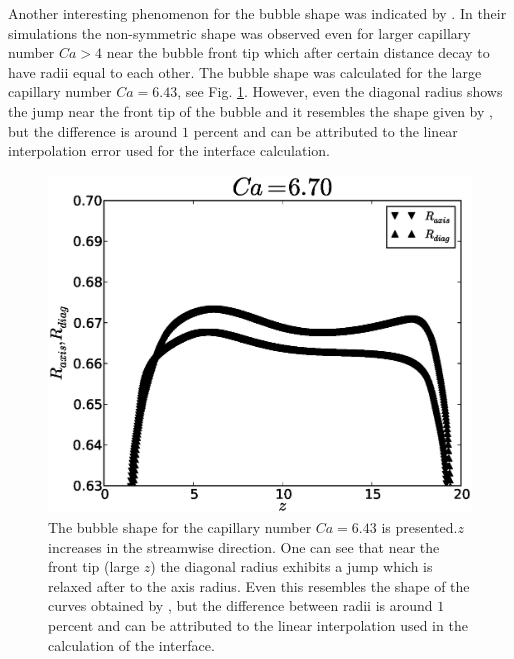 \documentclass{article}
\begin{document}
Another interesting phenomenon for the bubble shape was indicated by \citet{heil-threedim}. In
their simulations the non-symmetric shape was observed even for larger capillary number $Ca>4$ near
the bubble front tip which after certain distance decay to have radii equal to each other. The
bubble shape was calculated for the large capillary number $Ca=6.43$, see Fig.
\ref{fig:bubble:ca:large}. However, even the diagonal radius shows the jump near the front tip of
the bubble and it resembles the shape given by \citet{heil-threedim}, but the difference is around
$1$ percent and can be attributed to the linear interpolation error used for the interface
calculation. 
\begin{figure}[ht]
\includegraphics[width=\textwidth]{Figures/bubble_ca_large.eps}
\caption{The bubble shape for the capillary number $Ca=6.43$ is presented.$z$ increases in the
streamwise direction. One can see that near the front tip (large $z$) the diagonal radius exhibits
a jump which is relaxed after to the axis radius. Even this resembles
the shape of the curves obtained by \citet{heil-threedim}, but the
difference between radii is around $1$ percent and can be attributed to
the linear interpolation used in the calculation of the interface.\label{fig:bubble:ca:large}}
\end{figure}
\end{document}
